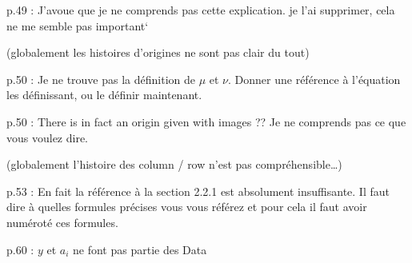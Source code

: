 p.49 : J'avoue que je ne comprends pas cette explication. 
je l’ai supprimer, cela ne me semble pas important`

(globalement les histoires d’origines ne sont pas clair du tout)

p.50 : Je ne trouve pas la définition de $\mu$ et $\nu$. Donner une référence à l'équation les définissant, ou le définir maintenant.

p.50 : There is in fact an origin given with images ?? Je ne comprends pas ce que vous voulez dire.

(globalement l’histoire des column / row n’est pas compréhensible…)

p.53 : En fait la référence à la section 2.2.1 est absolument insuffisante. Il faut dire à quelles formules précises vous vous référez et pour cela il faut avoir numéroté ces formules.

p.60 : $y$ et $a_i$ ne font pas partie des Data
